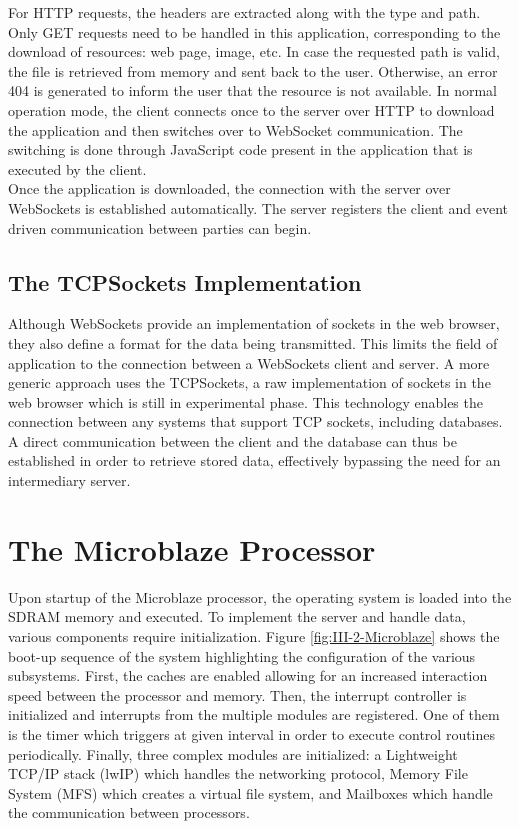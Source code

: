       For HTTP requests, the headers are extracted along with the type and path. Only GET requests need to be handled in this application, corresponding to the download of resources: web page, image, etc. In case the requested path is valid, the file is retrieved from memory and sent back to the user. Otherwise, an error 404 is generated to inform the user that the resource is not available. In normal operation mode, the client connects once to the server over HTTP to download the application and then switches over to WebSocket communication. The switching is done through JavaScript code present in the application that is executed by the client. \\

      Once the application is downloaded, the connection with the server over WebSockets is established automatically. The server registers the client and event driven communication between parties can begin.

    \subsection{The TCPSockets Implementation}

      Although WebSockets provide an implementation of sockets in the web browser, they also define a format for the data being transmitted. This limits the field of application to the connection between a WebSockets client and server. A more generic approach uses the TCPSockets, a raw implementation of sockets in the web browser which is still in experimental phase. This technology enables the connection between any systems that support TCP sockets, including databases. A direct communication between the client and the database can thus be established in order to retrieve stored data, effectively bypassing the need for an intermediary server.

  \section{The Microblaze Processor}

    Upon startup of the Microblaze processor, the operating system is loaded into the SDRAM memory and executed. To implement the server and handle data, various components require initialization. Figure \ref{fig:III-2-Microblaze} shows the boot-up sequence of the system highlighting the configuration of the various subsystems. First, the caches are enabled allowing for an increased interaction speed between the processor and memory. Then, the interrupt controller is initialized and interrupts from the multiple modules are registered. One of them is the timer which triggers at given interval in order to execute control routines periodically. Finally, three complex modules are initialized: a Lightweight TCP/IP stack (lwIP) which handles the networking protocol, Memory File System (MFS) which creates a virtual file system, and Mailboxes which handle the communication between processors.

